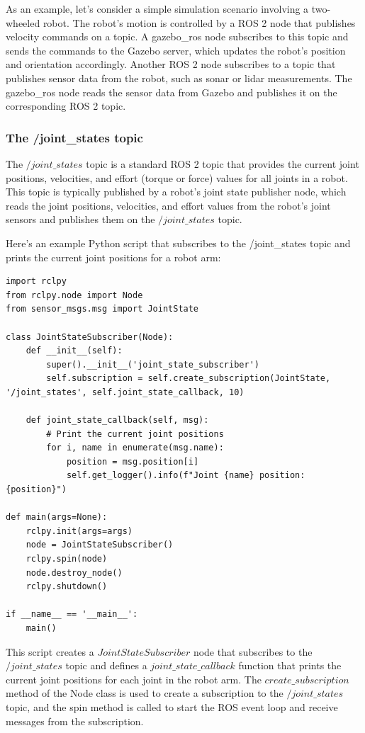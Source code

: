 \documentclass[12pt,oneside]{article}
\begin{document}
As an example, let's consider a simple simulation scenario involving a two-wheeled robot. The robot's motion is controlled by a ROS 2 node that publishes velocity commands on a topic. A gazebo\_ros node subscribes to this topic and sends the commands to the Gazebo server, which updates the robot's position and orientation accordingly. Another ROS 2 node subscribes to a topic that publishes sensor data from the robot, such as sonar or lidar measurements. The gazebo\_ros node reads the sensor data from Gazebo and publishes it on the corresponding ROS 2 topic.


\subsubsection{The /joint\_states topic}\label{ros2-joint-state}
The $/joint\_states$ topic is a standard ROS 2 topic that provides the current joint positions, velocities, and effort (torque or force) values for all joints in a robot. This topic is typically published by a robot's joint state publisher node, which reads the joint positions, velocities, and effort values from the robot's joint sensors and publishes them on the $/joint\_states$ topic.

Here's an example Python script that subscribes to the /joint\_states topic and prints the current joint positions for a robot arm:
\begin{tcolorbox}[]\label{box:mybox-1}
\begin{verbatim}
import rclpy
from rclpy.node import Node
from sensor_msgs.msg import JointState

class JointStateSubscriber(Node):
    def __init__(self):
        super().__init__('joint_state_subscriber')
        self.subscription = self.create_subscription(JointState, '/joint_states', self.joint_state_callback, 10)

    def joint_state_callback(self, msg):
        # Print the current joint positions
        for i, name in enumerate(msg.name):
            position = msg.position[i]
            self.get_logger().info(f"Joint {name} position: {position}")

def main(args=None):
    rclpy.init(args=args)
    node = JointStateSubscriber()
    rclpy.spin(node)
    node.destroy_node()
    rclpy.shutdown()

if __name__ == '__main__':
    main()
\end{verbatim}
\end{tcolorbox}
This script creates a $JointStateSubscriber$ node that subscribes to the $/joint\_states$ topic and defines a $joint\_state\_callback$ function that prints the current joint positions for each joint in the robot arm. The $create\_subscription$ method of the Node class is used to create a subscription to the $/joint\_states$ topic, and the spin method is called to start the ROS event loop and receive messages from the subscription.
\end{document}
